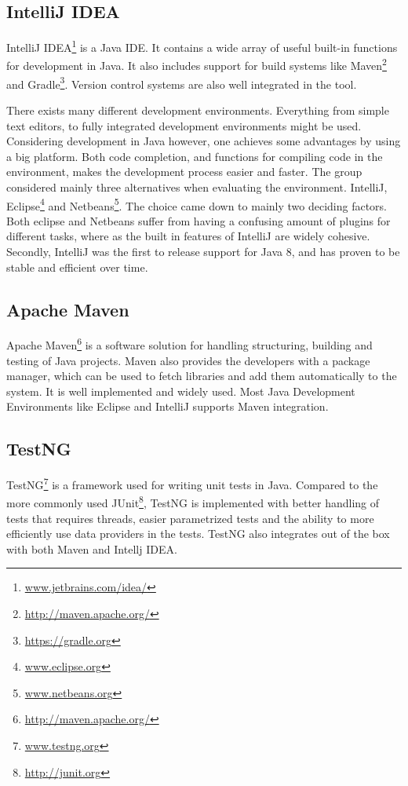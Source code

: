 \subsection{IntelliJ IDEA}
\label{subsec:prestudies-tools-intellij_idea}

IntelliJ IDEA\footnote{\url{www.jetbrains.com/idea/}} is a Java IDE. It contains a wide array of useful built-in functions for development in Java. It also includes support for build systems like Maven\footnote{\url{http://maven.apache.org/}} and Gradle\footnote{\url{https://gradle.org}}. Version control systems are also well integrated in the tool.

There exists many different development environments. Everything from simple text editors, to fully integrated development environments might be used. Considering development in Java however, one achieves some advantages by using a big platform. Both code completion, and functions for compiling code in the environment, makes the development process easier and faster. The group considered mainly three alternatives when evaluating the environment. IntelliJ, Eclipse\footnote{\url{www.eclipse.org}} and Netbeans\footnote{\url{www.netbeans.org}}. The choice came down to mainly two deciding factors. Both eclipse and Netbeans suffer from having a confusing amount of plugins for different tasks, where as the built in features of IntelliJ are widely cohesive. Secondly, IntelliJ was the first to release support for Java 8, and has proven to be stable and efficient over time.

\subsection{Apache Maven}
\label{subsec:prestudies-tools-apache_maven}

Apache Maven\footnote{\url{http://maven.apache.org/}} is a software solution for handling structuring, building and testing of Java projects. Maven also provides the developers with a package manager, which can be used to fetch libraries and add them automatically to the system. It is well implemented and widely used. Most Java Development Environments like Eclipse and IntelliJ supports Maven integration.

\subsection{TestNG}
\label{subsec:prestudies-tools-testng}

TestNG\footnote{\url{www.testng.org}} is a framework used for writing unit tests in Java. Compared to the more commonly used JUnit\footnote{\url{http://junit.org}}, TestNG is implemented with better handling of tests that requires threads, easier parametrized tests and the ability to more efficiently use data providers in the tests. TestNG also integrates out of the box with both Maven and Intellj IDEA.

